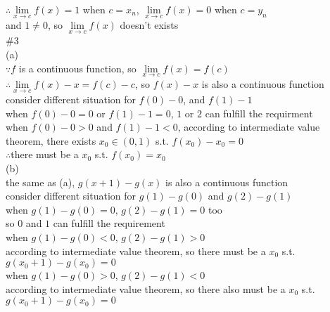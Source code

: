 \documentclass{article}
\begin{document}
$\therefore$\qquad$\lim \limits_{x \to c}f(x)=1$ when $c=x_n$, $\lim \limits_{x \to c}f(x)=0$ when $c=y_n$\\

and $1\neq0$, so $\lim \limits_{x \to c}f(x)$ doesn't exists\\

\textcolor[rgb]{0.00,0.00,0.50}{\#3}\\

(a)\\

$\because$\qquad$f$ is a continuous function, so $\lim \limits_{x \to c}f(x)=f(c)$\\

$\therefore$\qquad$\lim \limits_{x \to c}f(x)-x=f(c)-c$, so $f(x)-x$ is also a continuous function\\

consider different situation for $f(0)-0$, and $f(1)-1$\\

when $f(0)-0=0$ or $f(1)-1=0$, $1$ or $2$ can fulfill the requirment\\

when $f(0)-0>0$ and $f(1)-1<0$, according to intermediate value theorem, there exists $x_0\in(0,1)$ s.t. $f(x_0)-x_0=0$\\

$\therefore$\qquad there must be a $x_0$ s.t. $f(x_0)=x_0$\\

(b)\\

the same as (a), $g(x+1)-g(x)$ is also a continuous function\\

consider different situation for $g(1)-g(0)$ and $g(2)-g(1)$\\

when $g(1)-g(0)=0$, $g(2)-g(1)=0$ too\\

so $0$ and $1$ can fulfill the requirement\\

when $g(1)-g(0)<0$, $g(2)-g(1)>0$\\

according to intermediate value theorem, so there must be a $x_0$ s.t. $g(x_0+1)-g(x_0)=0$\\

when $g(1)-g(0)>0$, $g(2)-g(1)<0$\\

according to intermediate value theorem, so there also must be a $x_0$ s.t. $g(x_0+1)-g(x_0)=0$\\
\end{document}
